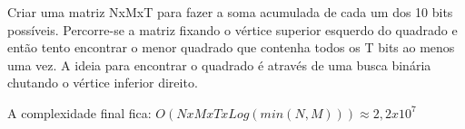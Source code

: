 Criar uma matriz NxMxT para fazer a soma acumulada de cada um dos 10 bits possíveis. Percorre-se a matriz fixando o vértice superior esquerdo do quadrado e então tento encontrar o menor quadrado que contenha todos os T bits ao menos uma vez. A ideia para encontrar o quadrado é através de uma busca binária chutando o vértice inferior direito.

A complexidade final fica: $O(NxMxTxLog(min(N, M)))  \approx 2,2 x 10^7$
